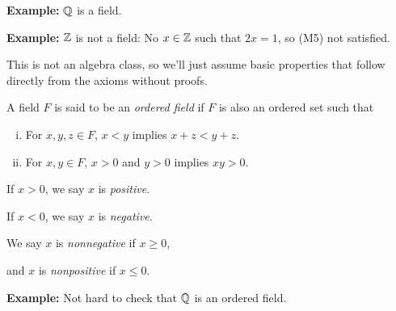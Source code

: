 \documentclass[10pt,aspectratio=149]{beamer}
\begin{document}
\begin{frame}

\textbf{Example:} ${\mathbb{Q}}$ is a field.

\medskip
\pause

\textbf{Example:} ${\mathbb{Z}}$ is not a field: No $x \in {\mathbb{Z}}$ such that $2x=1$,
so (M5) not satisfied.

\medskip
\pause

This is not an algebra class, so we'll just assume basic properties
that follow directly from the axioms without proofs.

\medskip
\pause

\begin{definition}
A field $F$ is said to be an \emph{ordered field} if
$F$ is also an ordered set such that
\begin{enumerate}[(i)]
\pause
\item \label{defn:ordfield:i} For $x,y,z \in F$,  $x < y$ implies $x+z <
y+z$.
\pause
\item \label{defn:ordfield:ii} For $x,y \in F$, $x > 0$ and $y > 0$
implies $xy > 0$.
\end{enumerate}
\pause
If $x > 0$, we say $x$ is \emph{positive}.

\pause
If $x < 0$, we say $x$ is \emph{negative}.

\pause
We say $x$ is \emph{nonnegative} if $x \geq 0$,

\pause
and $x$ is \emph{nonpositive} if $x \leq 0$.
\end{definition}

\pause

\textbf{Example:}
Not hard to check that ${\mathbb{Q}}$ is an ordered field.

\end{frame}
\end{document}
